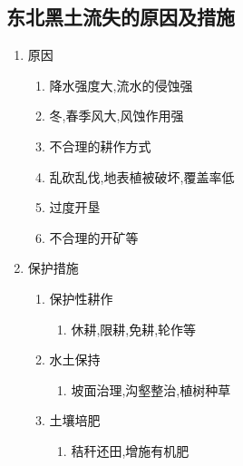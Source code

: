 \documentclass[a4paper]{article}
\begin{document}
    \subsection{东北黑土流失的原因及措施}
    \begin{enumerate}
        \item 原因
        \begin{enumerate}
            \item 降水强度大,流水的侵蚀强
            \item 冬,春季风大,风蚀作用强
            \item 不合理的耕作方式
            \item 乱砍乱伐,地表植被破坏,覆盖率低
            \item 过度开垦
            \item 不合理的开矿等
        \end{enumerate}
        \item 保护措施
        \begin{enumerate}
            \item 保护性耕作
            \begin{enumerate}
                \item 休耕,限耕,免耕,轮作等
            \end{enumerate}
            \item 水土保持
            \begin{enumerate}
                \item 坡面治理,沟壑整治,植树种草
            \end{enumerate}
            \item 土壤培肥
            \begin{enumerate}
                \item 秸秆还田,增施有机肥
            \end{enumerate}
        \end{enumerate}
    \end{enumerate}
\end{document}
